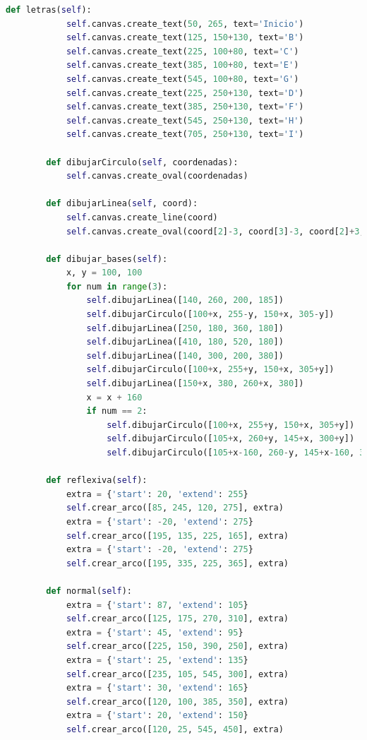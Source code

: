 \begin{lstlisting}[language=Python]
	    def letras(self):
	        self.canvas.create_text(50, 265, text='Inicio')
	        self.canvas.create_text(125, 150+130, text='B')
	        self.canvas.create_text(225, 100+80, text='C')
	        self.canvas.create_text(385, 100+80, text='E')
	        self.canvas.create_text(545, 100+80, text='G')
	        self.canvas.create_text(225, 250+130, text='D')
	        self.canvas.create_text(385, 250+130, text='F')
	        self.canvas.create_text(545, 250+130, text='H')
	        self.canvas.create_text(705, 250+130, text='I')

	    def dibujarCirculo(self, coordenadas):
	        self.canvas.create_oval(coordenadas)

	    def dibujarLinea(self, coord):
	        self.canvas.create_line(coord)
	        self.canvas.create_oval(coord[2]-3, coord[3]-3, coord[2]+3, coord[3]+3, fill='black')

	    def dibujar_bases(self):
	        x, y = 100, 100
	        for num in range(3):
	            self.dibujarLinea([140, 260, 200, 185])
	            self.dibujarCirculo([100+x, 255-y, 150+x, 305-y])
	            self.dibujarLinea([250, 180, 360, 180])
	            self.dibujarLinea([410, 180, 520, 180])
	            self.dibujarLinea([140, 300, 200, 380])
	            self.dibujarCirculo([100+x, 255+y, 150+x, 305+y])
	            self.dibujarLinea([150+x, 380, 260+x, 380])
	            x = x + 160
	            if num == 2:
	                self.dibujarCirculo([100+x, 255+y, 150+x, 305+y])
	                self.dibujarCirculo([105+x, 260+y, 145+x, 300+y])
	                self.dibujarCirculo([105+x-160, 260-y, 145+x-160, 300-y])

	    def reflexiva(self):
	        extra = {'start': 20, 'extend': 255}
	        self.crear_arco([85, 245, 120, 275], extra)
	        extra = {'start': -20, 'extend': 275}
	        self.crear_arco([195, 135, 225, 165], extra)
	        extra = {'start': -20, 'extend': 275}
	        self.crear_arco([195, 335, 225, 365], extra)

	    def normal(self):
	        extra = {'start': 87, 'extend': 105}
	        self.crear_arco([125, 175, 270, 310], extra)
	        extra = {'start': 45, 'extend': 95}
	        self.crear_arco([225, 150, 390, 250], extra)
	        extra = {'start': 25, 'extend': 135}
	        self.crear_arco([235, 105, 545, 300], extra)
	        extra = {'start': 30, 'extend': 165}
	        self.crear_arco([120, 100, 385, 350], extra)
	        extra = {'start': 20, 'extend': 150}
	        self.crear_arco([120, 25, 545, 450], extra)


\end{lstlisting}
